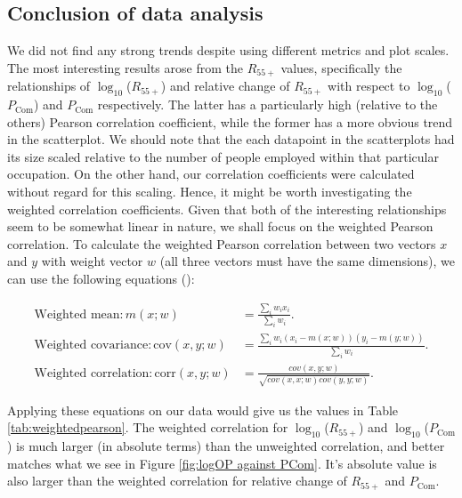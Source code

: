 \documentclass[11pt]{article}
\begin{document}
\subsection{Conclusion of data analysis}
We did not find any strong trends despite using different metrics and plot scales. The most interesting results arose from the $R_{55+}$ values, specifically the relationships of $\log_{10}$($R_{55+}$) and relative change of $R_{55+}$ with respect to $\log_{10}$($P_{\text{Com}}$) and $P_{\text{Com}}$ respectively. The latter has a particularly high (relative to the others) Pearson correlation coefficient, while the former has a more obvious trend in the scatterplot. We should note that the each datapoint in the scatterplots had its size scaled relative to the number of people employed within that particular occupation. On the other hand, our correlation coefficients were calculated without regard for this scaling. Hence, it might be worth investigating the weighted correlation coefficients. Given that both of the interesting relationships seem to be somewhat linear in nature, we shall focus on the weighted Pearson correlation. To calculate the weighted Pearson correlation between two vectors $x$ and $y$ with weight vector $w$ (all three vectors must have the same dimensions), we can use the following equations (\cite{bailey2018weighted}):

\begin{equation} \label{eq1}
	\begin{split}
		\text{Weighted mean}: m(x; w) & = \frac{\sum_{i}w_{i}x_{i}}{\sum_{i}w_{i}}. \\
		\text{Weighted covariance}: \text{cov}(x, y; w) & = \frac{\sum_{i}w_{i}(x_{i}-m(x; w))(y_{i}-m(y; w))}{\sum_{i}w_{i}}. \\
		\text{Weighted correlation}: \text{corr}(x, y; w) & = \frac{cov(x, y; w)}{\sqrt{cov(x, x; w)cov(y, y; w)}}.
	\end{split}
	\end{equation}

Applying these equations on our data would give us the values in Table \ref{tab:weightedpearson}. The weighted correlation for $\log_{10}$($R_{55+}$) and $\log_{10}$($P_{\text{Com}}$) is much larger (in absolute terms) than the unweighted correlation, and better matches what we see in Figure \ref{fig:logOP against PCom}. It's absolute value is also larger than the weighted correlation for relative change of $R_{55+}$ and $P_{\text{Com}}$.
\end{document}
